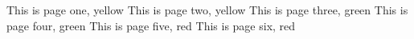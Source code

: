 \documentclass[a4paper]{article}
\begin{document}
\pagecolor{yellow}
This is page one, yellow
\newpage
This is page two, yellow
\newpage
\pagecolor{green}
This is page three, green
\newpage
This is page four, green
\newpage
\pagecolor{red}
This is page five, red
\newpage
This is page six, red
\end{document}

